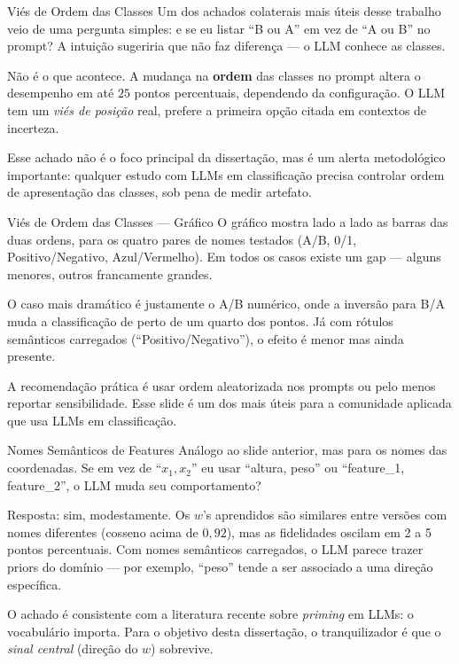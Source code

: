 \documentclass[aspectratio=169,10pt]{beamer}
\begin{document}
\begin{frame}{Vi\'es de Ordem das Classes}
  \small
  Um dos achados colaterais mais \'uteis desse trabalho veio de uma pergunta simples: e se eu listar
  ``B ou A'' em vez de ``A ou B'' no prompt? A intui\c{c}\~ao sugeriria que n\~ao faz diferen\c{c}a --- o
  LLM conhece as classes.
  \medskip

  N\~ao \'e o que acontece. A mudan\c{c}a na \textbf{ordem} das classes no prompt altera o desempenho em
  at\'e $25$ pontos percentuais, dependendo da configura\c{c}\~ao. O LLM tem um \emph{vi\'es de
  posi\c{c}\~ao} real, prefere a primeira op\c{c}\~ao citada em contextos de incerteza.
  \medskip

  Esse achado n\~ao \'e o foco principal da disserta\c{c}\~ao, mas \'e um alerta metodol\'ogico importante:
  qualquer estudo com LLMs em classifica\c{c}\~ao precisa controlar ordem de apresenta\c{c}\~ao das classes,
  sob pena de medir artefato.
\end{frame}

\begin{frame}{Vi\'es de Ordem das Classes --- Gr\'afico}
  \small
  O gr\'afico mostra lado a lado as barras das duas ordens, para os quatro pares de nomes testados
  (A/B, 0/1, Positivo/Negativo, Azul/Vermelho). Em todos os casos existe um gap ---
  alguns menores, outros francamente grandes.
  \medskip

  O caso mais dram\'atico \'e justamente o A/B num\'erico, onde a invers\~ao para B/A muda a
  classifica\c{c}\~ao de perto de um quarto dos pontos. J\'a com r\'otulos sem\^anticos carregados
  (``Positivo/Negativo''), o efeito \'e menor mas ainda presente.
  \medskip

  A recomenda\c{c}\~ao pr\'atica \'e usar ordem aleatorizada nos prompts ou pelo menos reportar
  sensibilidade. Esse slide \'e um dos mais \'uteis para a comunidade aplicada que usa LLMs em
  classifica\c{c}\~ao.
\end{frame}

\begin{frame}{Nomes Sem\^anticos de Features}
  \small
  An\'alogo ao slide anterior, mas para os nomes das coordenadas. Se em vez de ``$x_1, x_2$'' eu usar
  ``altura, peso'' ou ``feature\_1, feature\_2'', o LLM muda seu comportamento?
  \medskip

  Resposta: sim, modestamente. Os $w$'s aprendidos s\~ao similares entre vers\~oes com nomes diferentes
  (cosseno acima de $0{,}92$), mas as fidelidades oscilam em 2 a 5 pontos percentuais. Com nomes
  sem\^anticos carregados, o LLM parece trazer priors do dom\'inio --- por exemplo, ``peso'' tende a
  ser associado a uma dire\c{c}\~ao espec\'ifica.
  \medskip

  O achado \'e consistente com a literatura recente sobre \emph{priming} em LLMs: o vocabul\'ario importa.
  Para o objetivo desta disserta\c{c}\~ao, o tranquilizador \'e que o \emph{sinal central} (dire\c{c}\~ao
  do $w$) sobrevive.
\end{frame}
\end{document}
